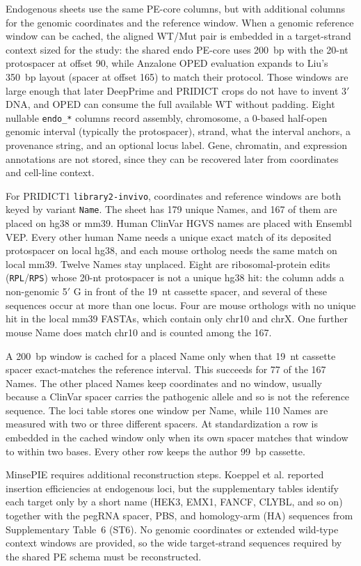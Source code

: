 \documentclass{article}
\begin{document}
Endogenous sheets use the same PE-core columns, but with additional columns for the genomic coordinates and the reference window. When a genomic reference window can be cached, the aligned WT/Mut pair is embedded in a target-strand context sized for the study: the shared endo PE-core uses 200~bp with the 20-nt protospacer at offset 90, while Anzalone OPED evaluation expands to Liu's 350~bp layout (spacer at offset 165) to match their protocol. Those windows are large enough that later DeepPrime and PRIDICT crops do not have to invent 3$'$ DNA, and OPED can consume the full available WT without padding. Eight nullable \nolinkurl{endo\_*} columns record assembly, chromosome, a 0-based half-open genomic interval (typically the protospacer), strand, what the interval anchors, a provenance string, and an optional locus label. Gene, chromatin, and expression annotations are not stored, since they can be recovered later from coordinates and cell-line context.

For PRIDICT1 \nolinkurl{library2-invivo}, coordinates and reference windows are both keyed by variant \nolinkurl{Name}. The sheet has 179 unique Names, and 167 of them are placed on hg38 or mm39. Human ClinVar HGVS names are placed with Ensembl VEP. Every other human Name needs a unique exact match of its deposited protospacer on local hg38, and each mouse ortholog needs the same match on local mm39. Twelve Names stay unplaced. Eight are ribosomal-protein edits (\nolinkurl{RPL}/\nolinkurl{RPS}) whose 20-nt protospacer is not a unique hg38 hit: the column adds a non-genomic 5$'$ G in front of the 19~nt cassette spacer, and several of these sequences occur at more than one locus. Four are mouse orthologs with no unique hit in the local mm39 FASTAs, which contain only chr10 and chrX. One further mouse Name does match chr10 and is counted among the 167.

A 200~bp window is cached for a placed Name only when that 19~nt cassette spacer exact-matches the reference interval. This succeeds for 77 of the 167 Names. The other placed Names keep coordinates and no window, usually because a ClinVar spacer carries the pathogenic allele and so is not the reference sequence. The loci table stores one window per Name, while 110 Names are measured with two or three different spacers. At standardization a row is embedded in the cached window only when its own spacer matches that window to within two bases. Every other row keeps the author 99~bp cassette.

MinsePIE requires additional reconstruction steps. Koeppel et al. reported insertion efficiencies at endogenous loci, but the supplementary tables identify each target only by a short name (HEK3, EMX1, FANCF, CLYBL, and so on) together with the pegRNA spacer, PBS, and homology-arm (HA) sequences from Supplementary Table~6 (ST6). No genomic coordinates or extended wild-type context windows are provided, so the wide target-strand sequences required by the shared PE schema must be reconstructed.
\end{document}
